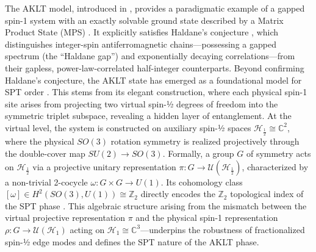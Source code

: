 \documentclass[12pt,a4paper]{article}
\begin{document}
The AKLT model, introduced in \cite{AKLT1987, Affleck1988}, provides a paradigmatic example of a gapped spin-1 system with an exactly solvable ground state described by a Matrix Product State (MPS) \cite{FNW92}. It explicitly satisfies Haldane's conjecture \cite{Haldine83}, which distinguishes integer-spin antiferromagnetic chains—possessing a gapped spectrum (the “Haldane gap”) and exponentially decaying correlations—from their gapless, power-law-correlated half-integer counterparts. Beyond confirming  Haldane's conjecture, the AKLT state has emerged as a foundational model for SPT order \cite{Pollmann2010, Pollmann2012}. This stems from its elegant construction, where each physical spin-1 site arises from projecting two virtual spin-½ degrees of freedom into the symmetric triplet subspace, revealing a hidden layer of entanglement. At the virtual level, the system is constructed on auxiliary spin-½ spaces $\mathcal{H}_{\frac{1}{2}} \cong \mathbb{C}^2$, where the physical $SO(3)$ rotation symmetry is realized projectively through the double-cover map $SU(2) \to SO(3)$. Formally,  a  group $G$ of  symmetry acts on $\mathcal{H}_{\frac{1}{2}}$ via a projective unitary representation $\pi: G \to \mathcal{U}(\mathcal{H}_{\frac{1}{2}})$, characterized by a non-trivial 2-cocycle $\omega: G \times G \to U(1)$. Its cohomology class $[\omega] \in H^{2}(SO(3), U(1)) \cong \mathbb{Z}_2$ directly encodes the $\mathbb{Z}_2$ topological index of the SPT phase \cite{Chen2011b}. This algebraic structure arising from the mismatch between the virtual projective representation $\pi$ and the physical spin-1 representation $\rho: G \to \mathcal{U}(\mathcal{H}_1)$ acting on $\mathcal{H}_1 \cong \mathbb{C}^3$---underpins the robustness of fractionalized spin-½ edge modes and defines the SPT nature of the AKLT phase.
\end{document}
